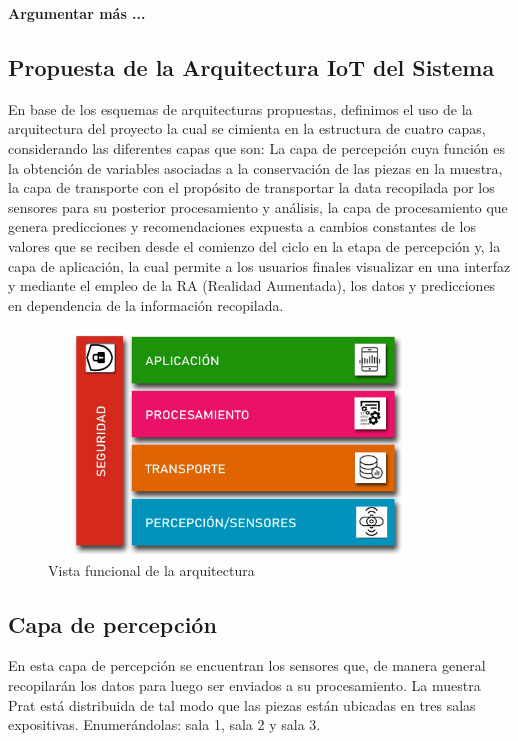     \textbf{Argumentar más ...}

    \subsection{Propuesta de la Arquitectura IoT del Sistema}

    En base de los esquemas de arquitecturas propuestas, definimos el uso de la arquitectura del proyecto la cual se cimienta en la estructura de cuatro capas, considerando las diferentes capas que son: La capa de percepción cuya función es la obtención de variables asociadas a la conservación de las piezas en la muestra, la capa de transporte con el propósito de transportar la data recopilada por los sensores para su posterior procesamiento y análisis, la capa de procesamiento que genera predicciones y recomendaciones expuesta a cambios constantes de los valores que se reciben desde el comienzo del ciclo en la etapa de percepción y, la capa de aplicación, la cual permite a los usuarios finales visualizar en una interfaz y mediante el empleo de la RA (Realidad Aumentada), los datos y predicciones en dependencia de la información recopilada.\\

    \begin{figure}[h]
        \centering
        \includegraphics[width=10cm, height=6cm]{imagenes/myArquitecture0.jpg}
        \caption{Vista funcional de la arquitectura}
        \label{imag:arquitecturaPropuesta}
    \end{figure}

    \subsection{Capa de percepción}\label{subsec:capa_percepcion}
    En esta capa de percepción se encuentran los sensores que, de manera general recopilarán los datos para luego ser enviados a su procesamiento. La muestra Prat está distribuida de tal modo que las piezas están ubicadas en tres salas expositivas. Enumerándolas: sala 1, sala 2 y sala 3.\\\\


